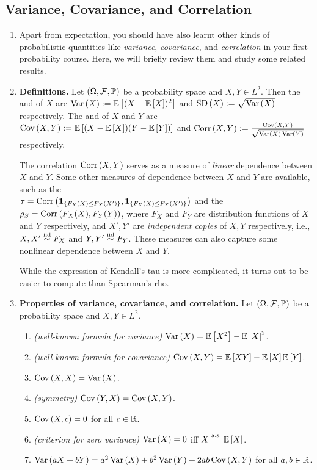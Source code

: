 \subsection{Variance, Covariance, and Correlation}
\begin{enumerate}
\item Apart from expectation, you should have also learnt other kinds of
probabilistic quantities like \emph{variance}, \emph{covariance}, and
\emph{correlation} in your first probability course. Here, we will briefly
review them and study some related results.
\item \textbf{Definitions.} Let \((\Omega,\mathcal{F},\mathbb{P})\) be a probability
space and \(X,Y\in L^2\). Then the  and  of \(X\) are \(\operatorname{Var}\left(X\right):=\mathbb{E}\left[(X-\mathbb{E}\left[X\right])^{2}\right]\) and
\(\operatorname{SD}\left(X\right):=\sqrt{\operatorname{Var}\left(X\right)}\) respectively. The  and 
of \(X\) and \(Y\) are \(\operatorname{Cov}\left(X,Y\right):=\mathbb{E}\left[(X-\mathbb{E}\left[X\right])(Y-\mathbb{E}\left[Y\right])\right]\) and
\(\operatorname{Corr}\left(X,Y\right):=\frac{\operatorname{Cov}\left(X,Y\right)}{\sqrt{\operatorname{Var}\left(X\right)\operatorname{Var}\left(Y\right)}}\) respectively.

\begin{note}
The correlation \(\operatorname{Corr}\left(X,Y\right)\) serves as a measure of \emph{linear} dependence
between \(X\) and \(Y\). Some other measures of dependence between \(X\) and
\(Y\) are available, such as the  \\
\(\tau=\operatorname{Corr}\left(\mathbf{1}_{\left\{F_X(X)\le F_X(X')\right\}},\mathbf{1}_{\left\{F_X(X)\le F_X(X')\right\}}\right)\)
and the  \(\rho_S=\operatorname{Corr}\left(F_X(X),F_Y(Y)\right)\), where \(F_X\)
and \(F_Y\) are distribution functions of \(X\) and \(Y\) respectively, and
\(X',Y'\) are \emph{independent copies} of \(X,Y\) respectively, i.e.,
\(X,X'\overset{\text{iid}}\sim F_X\) and \(Y,Y'\overset{\text{iid}}\sim F_Y\). These measures can also capture some
nonlinear dependence between \(X\) and \(Y\).

While the expression of Kendall's tau is more complicated, it turns out to be
easier to compute than Spearman's rho.
\end{note}
\item\label{it:var-cov-corr-prop} \textbf{Properties of variance, covariance,
and correlation.} Let \((\Omega,\mathcal{F},\mathbb{P})\) be a probability space and
\(X,Y\in L^2\).
\begin{enumerate}
\item \emph{(well-known formula for variance)} \(\operatorname{Var}\left(X\right)=\mathbb{E}\left[X^{2}\right]-\mathbb{E}\left[X\right]^{2}\).
\item \emph{(well-known formula for covariance)} \(\operatorname{Cov}\left(X,Y\right)=\mathbb{E}\left[XY\right]-\mathbb{E}\left[X\right]\mathbb{E}\left[Y\right]\).
\item \(\operatorname{Cov}\left(X,X\right)=\operatorname{Var}\left(X\right)\).
\item \emph{(symmetry)} \(\operatorname{Cov}\left(Y,X\right)=\operatorname{Cov}\left(X,Y\right)\).
\item \(\operatorname{Cov}\left(X,c\right)=0\) for all \(c\in\mathbb{R}\).
\item \emph{(criterion for zero variance)} \(\operatorname{Var}\left(X\right)=0\) iff \(X\overset{\text{a.s.}}= \mathbb{E}\left[X\right]\).
\item \(\operatorname{Var}\left(aX+bY\right)=a^{2}\operatorname{Var}\left(X\right)+b^{2}\operatorname{Var}\left(Y\right)+2ab\operatorname{Cov}\left(X,Y\right)\) for all \(a,b\in\mathbb{R}\).


\end{enumerate}
\end{enumerate}
